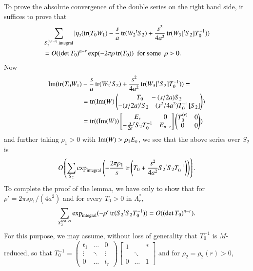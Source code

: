 To prove the absolute convergence of the double series on the right
hand side, it suffices to prove that
\begin{align*}
& \sum_{S_{2}^{(r,n-r)}\text{
    integral}}|\eta_{s}(\operatorname{tr}(T_{0}W_{1})-\frac{s}{a}
  \operatorname{tr}(W_{2}{}^{t}S_{2}) +
  \frac{s^{2}}{4a^{2}}\operatorname{tr}(W_{3}[{}^{t}S_{2}]T^{-1}_{0}))\\
&= O((\det T_{0})^{n-r}\exp(-2\pi \rho \operatorname{tr}(T_{0}))\text{ \  for some
  \ } \rho>0.
\end{align*}
Now\pageoriginale
\begin{align*}
\operatorname{Im}(\operatorname{tr}(T_{0}W_{1}) &-
\frac{s}{a}\operatorname{tr}(W_{2}{}^{t}S_{2}) + \frac{s^{2}}{4a^{2}}
\operatorname{tr}(W_{3}[{}^{t}S_{2}]T^{-1}_{0}))=\\
&= \operatorname{tr}(\operatorname{Im}(W)
\begin{pmatrix}
T_{0} \quad -(s/2a)S_{2}\\
-(s/2a){}^{t}S_{2} \quad (s^{2}/4a^{2})T^{-1}_{0}[S_{2}]
\end{pmatrix}
)\\
&= \operatorname{tr}((\operatorname{Im}(W))
\begin{bmatrix}
E_{r} & 0\\
-\frac{s}{2a}{}^{t}S_{2}T^{-1}_{0} & E_{n-r}
\end{bmatrix}
\begin{pmatrix}
T^{(r)}_{0} & 0\\
0 & 0
\end{pmatrix}
)
\end{align*}
and further taking $\rho_{1}>0$ with $\operatorname{Im}(W)>\rho_{1}E_{n}$, we see
that the above series over $S_{2}$ is 
$$
O\left(\sum_{S_{2}}\exp\limits_{\text{integral}}\left(-\frac{2\pi\rho_{1}}{s}\operatorname{tr}\left(T_{0}+\frac{s^{2}}{4a^{2}}S_{2}{}^{t}S_{2}T^{-1}_{0}\right)\right)\right).
$$
To complete the proof of the lemma, we have only to show that for
$\rho'=2\pi s\rho_{1}/(4a^{2})$ and for every $T_{0}>0$ in
$\Lambda^{\ast}_{r}$,
$$
\sum_{S_{2}^{(r,n-r)}}\exp\limits_{\text{integral}}(-\rho'\operatorname{tr}(S_{2}{}^{t}S_{2}T^{-1}_{0}))=O((\det
T_{0})^{n-r}). 
$$
For this purpose, we may assume, without loss of generality that
$T^{-1}_{0}$ is $M$-reduced, so that
$T^{-1}_{0}=\left(\begin{smallmatrix} t_{1} & \ldots & 0\\ \vdots &
  \ddots & \vdots\\ 0 & \ldots & t_{r}
\end{smallmatrix}\right)\left[\begin{smallmatrix} 1 & & \ast\\ &
    \ddots & \\ 0 & \ldots & 1
  \end{smallmatrix}\right]$ and for $\rho_{2}=\rho_{2}(r)>0$,
